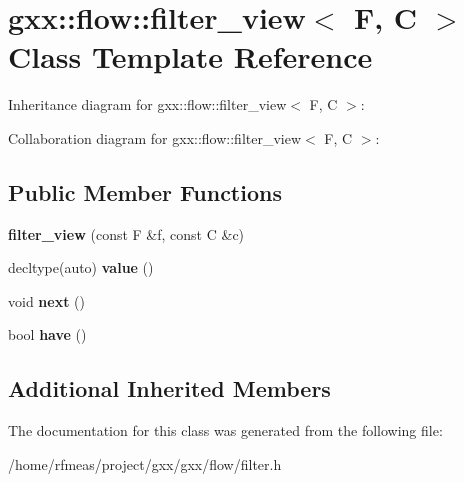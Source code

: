 \hypertarget{classgxx_1_1flow_1_1filter__view}{}\section{gxx\+:\+:flow\+:\+:filter\+\_\+view$<$ F, C $>$ Class Template Reference}
\label{classgxx_1_1flow_1_1filter__view}


Inheritance diagram for gxx\+:\+:flow\+:\+:filter\+\_\+view$<$ F, C $>$\+:


Collaboration diagram for gxx\+:\+:flow\+:\+:filter\+\_\+view$<$ F, C $>$\+:
\subsection*{Public Member Functions}
\begin{DoxyCompactItemize}
\item 
{\bfseries filter\+\_\+view} (const F \&f, const C \&c)\hypertarget{classgxx_1_1flow_1_1filter__view_a334c330acd4e3c487486020000d0dd1b}{}\label{classgxx_1_1flow_1_1filter__view_a334c330acd4e3c487486020000d0dd1b}

\item 
decltype(auto) {\bfseries value} ()\hypertarget{classgxx_1_1flow_1_1filter__view_a0a78b8715d979b2cd0f1bd54ed08b909}{}\label{classgxx_1_1flow_1_1filter__view_a0a78b8715d979b2cd0f1bd54ed08b909}

\item 
void {\bfseries next} ()\hypertarget{classgxx_1_1flow_1_1filter__view_a331c55980e0c7a6e575fcdb0fc91eac8}{}\label{classgxx_1_1flow_1_1filter__view_a331c55980e0c7a6e575fcdb0fc91eac8}

\item 
bool {\bfseries have} ()\hypertarget{classgxx_1_1flow_1_1filter__view_a7ce314457f20751f1848696ef66aa469}{}\label{classgxx_1_1flow_1_1filter__view_a7ce314457f20751f1848696ef66aa469}

\end{DoxyCompactItemize}
\subsection*{Additional Inherited Members}


The documentation for this class was generated from the following file\+:\begin{DoxyCompactItemize}
\item 
/home/rfmeas/project/gxx/gxx/flow/filter.\+h\end{DoxyCompactItemize}
